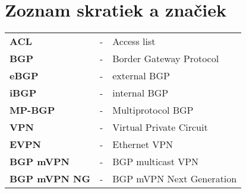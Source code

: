 \chapter*{Zoznam skratiek a značiek}

\begin{longtabu} to \textwidth {X[1.0,l] X[0.2,c] X[5,l]}
    \textbf{ACL} & - & Access list \\
    
    \textbf{BGP} & - & Border Gateway Protocol \\
    \textbf{eBGP} & - & external BGP \\
    \textbf{iBGP} & - & internal BGP \\
    \textbf{MP-BGP} & - & Multiprotocol BGP \\
    
    \textbf{VPN} & - & Virtual Private Circuit \\
    \textbf{EVPN} & - & Ethernet VPN\\
    \textbf{BGP mVPN} & - & BGP multicast VPN \\
    \textbf{BGP mVPN NG} & - & BGP mVPN Next Generation\\
    

\end{longtabu}
